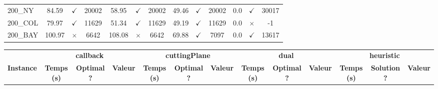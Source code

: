 \documentclass[main.tex]{subfiles}
\begin{document}
\begin{landscape}
\begin{center}
\begin{tabular}{lcccccccccccc}
200\_NY & 84.59 & $\checkmark$ & 20002 & 58.95 & $\checkmark$ & 20002 & 49.46 & $\checkmark$ & 20002 & 0.0 & $\checkmark$ & 30017\\
200\_COL & 79.97 & $\checkmark$ & 11629 & 51.34 & $\checkmark$ & 11629 & 49.19 & $\checkmark$ & 11629 & 0.0 & $\times$ & -1\\
200\_BAY & 100.97 & $\times$ & 6642 & 108.08 & $\times$ & 6642 & 69.88 & $\checkmark$ & 7097 & 0.0 & $\checkmark$ & 13617\\
\hline\end{tabular}
\end{center}
\end{landscape}
\newpage
\begin{landscape}
\begin{center}
\renewcommand{\arraystretch}{1.4} 
 \begin{tabular}{lcccccccccccc}
	\hline
 & \multicolumn{3}{c}{\textbf{callback}} & \multicolumn{3}{c}{\textbf{cuttingPlane}} & \multicolumn{3}{c}{\textbf{dual}} & \multicolumn{3}{c}{\textbf{heuristic}}\\
\textbf{Instance}  & \textbf{Temps (s)} & \textbf{Optimal ?} & \textbf{Valeur} & \textbf{Temps (s)} & \textbf{Optimal ?} & \textbf{Valeur} & \textbf{Temps (s)} & \textbf{Optimal ?} & \textbf{Valeur} & \textbf{Temps (s)} & \textbf{Solution ?} & \textbf{Valeur}\\\hline


\end{tabular}
\end{center}
\end{landscape}
\end{document}

